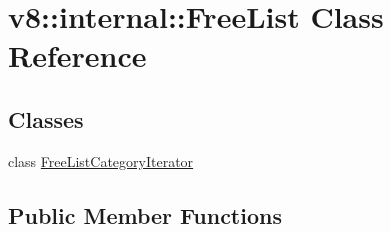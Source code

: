 \hypertarget{classv8_1_1internal_1_1_free_list}{}\section{v8\+:\+:internal\+:\+:Free\+List Class Reference}
\label{classv8_1_1internal_1_1_free_list}
\subsection*{Classes}
\begin{DoxyCompactItemize}
\item 
class \hyperlink{classv8_1_1internal_1_1_free_list_1_1_free_list_category_iterator}{Free\+List\+Category\+Iterator}
\end{DoxyCompactItemize}
\subsection*{Public Member Functions}
